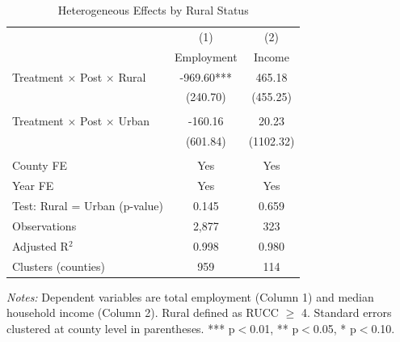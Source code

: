 \documentclass[12pt]{article}
\begin{document}
\begin{table}[H]
\centering
\caption{Heterogeneous Effects by Rural Status}
\label{tab:heterogeneity}
\begin{tabular}{lcc}
\toprule
& (1) & (2) \\
& Employment & Income \\
\midrule
Treatment $\times$ Post $\times$ Rural & -969.60*** & 465.18 \\
& (240.70) & (455.25) \\
\\
Treatment $\times$ Post $\times$ Urban & -160.16 & 20.23 \\
& (601.84) & (1102.32) \\
\\
County FE & Yes & Yes \\
Year FE & Yes & Yes \\
\midrule
Test: Rural = Urban (p-value) & 0.145 & 0.659 \\
Observations & 2,877 & 323 \\
Adjusted R$^2$ & 0.998 & 0.980 \\
Clusters (counties) & 959 & 114 \\
\bottomrule
\end{tabular}
\begin{tablenotes}
\small
\item \textit{Notes:} Dependent variables are total employment (Column 1) and median household income (Column 2). Rural defined as RUCC $\geq$ 4. Standard errors clustered at county level in parentheses. *** p$<$0.01, ** p$<$0.05, * p$<$0.10.
\end{tablenotes}
\end{table}
\end{document}
